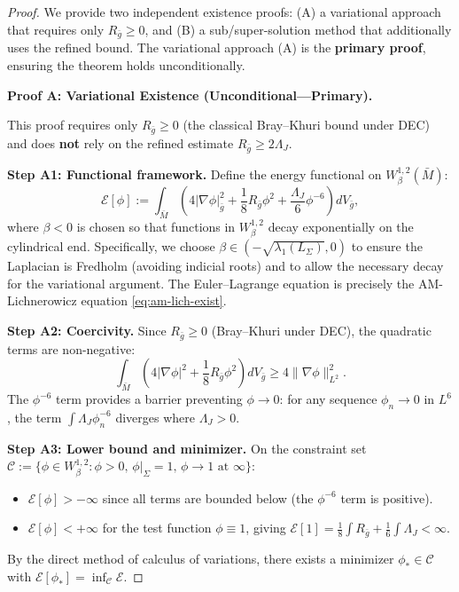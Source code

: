 \documentclass[12pt]{article}
\theoremstyle{plain}
\theoremstyle{definition}
\theoremstyle{remark}
\newcommand{\bg}{\bar{g}}
\newcommand{\bM}{\bar{M}}
\begin{document}
\begin{proof}
We provide two independent existence proofs: (A) a variational approach that requires only $R_{\bg} \geq 0$, and (B) a sub/super-solution method that additionally uses the refined bound. The variational approach (A) is the \textbf{primary proof}, ensuring the theorem holds unconditionally.

\textbf{Proof A: Variational Existence (Unconditional---Primary).}

This proof requires only $R_{\bg} \geq 0$ (the classical Bray--Khuri bound under DEC) and does \textbf{not} rely on the refined estimate $R_{\bg} \geq 2\Lambda_J$.

\textbf{Step A1: Functional framework.} Define the energy functional on $W^{1,2}_\beta(\bM)$:
\[
\mathcal{E}[\phi] := \int_{\bM} \left(4|\nabla\phi|^2_{\bg} + \frac{1}{8}R_{\bg}\phi^2 + \frac{\Lambda_J}{6}\phi^{-6}\right) dV_{\bg},
\]
where $\beta < 0$ is chosen so that functions in $W^{1,2}_\beta$ decay exponentially on the cylindrical end. Specifically, we choose $\beta \in (-\sqrt{\lambda_1(L_\Sigma)}, 0)$ to ensure the Laplacian is Fredholm (avoiding indicial roots) and to allow the necessary decay for the variational argument. The Euler--Lagrange equation is precisely the AM-Lichnerowicz equation \eqref{eq:am-lich-exist}.

\textbf{Step A2: Coercivity.} Since $R_{\bg} \geq 0$ (Bray--Khuri under DEC), the quadratic terms are non-negative:
\[
\int_{\bM} \left(4|\nabla\phi|^2 + \frac{1}{8}R_{\bg}\phi^2\right) dV_{\bg} \geq 4\|\nabla\phi\|_{L^2}^2.
\]
The $\phi^{-6}$ term provides a barrier preventing $\phi \to 0$: for any sequence $\phi_n \to 0$ in $L^6$, the term $\int \Lambda_J \phi_n^{-6}$ diverges where $\Lambda_J > 0$.

\textbf{Step A3: Lower bound and minimizer.} On the constraint set $\mathcal{C} := \{\phi \in W^{1,2}_\beta : \phi > 0, \, \phi|_\Sigma = 1, \, \phi \to 1 \text{ at } \infty\}$:
\begin{itemize}
    \item $\mathcal{E}[\phi] > -\infty$ since all terms are bounded below (the $\phi^{-6}$ term is positive).
    \item $\mathcal{E}[\phi] < +\infty$ for the test function $\phi \equiv 1$, giving $\mathcal{E}[1] = \frac{1}{8}\int R_{\bg} + \frac{1}{6}\int \Lambda_J < \infty$.
\end{itemize}
By the direct method of calculus of variations, there exists a minimizer $\phi_* \in \mathcal{C}$ with $\mathcal{E}[\phi_*] = \inf_{\mathcal{C}}\mathcal{E}$.


\end{proof}
\end{document}
